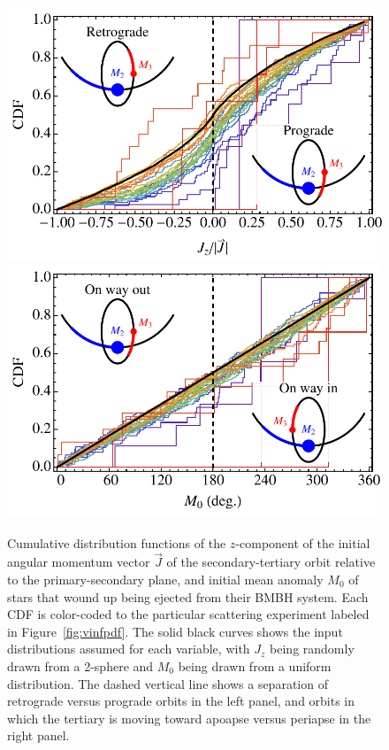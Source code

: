 \documentclass[a4paper,twocolumn]{emulateapj}
\begin{document}
{\begin{figure}
\centering\includegraphics[width=0.9\linewidth,clip=true]{JzCDF}\\
\includegraphics[width=0.9\linewidth,clip=true]{MCDF}
\caption{Cumulative distribution functions of the $z$-component of the initial angular momentum vector $\vec{J}$ of the secondary-tertiary orbit relative to the primary-secondary plane, and initial mean anomaly $M_{0}$ of stars that wound up being ejected from their BMBH system. Each CDF is color-coded to the particular scattering experiment labeled in Figure~\ref{fig:vinfpdf}. The solid black curves shows the input distributions assumed for each variable, with $J_{z}$ being randomly drawn from a 2-sphere and $M_{0}$ being drawn from a uniform distribution. The dashed vertical line shows a separation of retrograde versus prograde orbits in the left panel, and orbits in which the tertiary is moving toward apoapse versus periapse in the right panel.}
\label{fig:angle0}
\end{figure}

}
\end{document}
